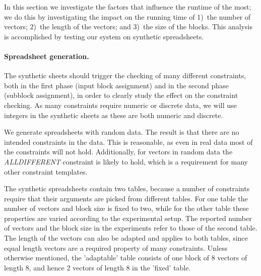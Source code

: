 In this section we investigate the factors that influence the runtime of \sname the most; we do this by investigating the impact on the running time of 1)~the number of vectors; 2)~the length of the vectors; and 3)~the size of the blocks.
This analysis is accomplished by testing our system on synthetic spreadsheets. 

\paragraph{Spreadsheet generation.}
The synthetic sheets should trigger the checking of many different constraints, both in the first phase (input block assignment) and in the second phase (subblock assignment), in order to clearly study the effect on the constraint checking. As many constraints require numeric or discrete data, we will use integers in the synthetic sheets as these are both numeric and discrete.

We generate spreadsheets with random data. The result is that there are no intended constraints in the data. This is reasonable, as even in real data most of the constraints will not hold. Additionally, for vectors in random data the \textit{ALLDIFFERENT} constraint is likely to hold, which is a requirement for many other constraint templates.

The synthetic spreadsheets contain two tables, because a number of constraints require that their arguments are picked from different tables. For one table the number of vectors and block size is fixed to two, while for the other table these properties are varied according to the experimental setup.
The reported number of vectors and the block size in the experiments refer to those of the second table. The length of the vectors can also be adapted and applies to both tables, since equal length vectors are a required property of many constraints.
Unless otherwise mentioned, the 'adaptable' table consists of one block of $8$ vectors of length $8$, and hence 2 vectors of length $8$ in the 'fixed' table.



